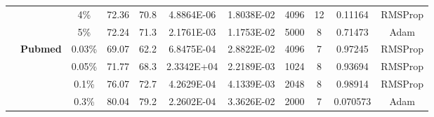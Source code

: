 \documentclass{article}
\begin{document}
\begin{table}[htbp]
\begin{tabular}{ccccc|cccccc}
          &       & 4\%   & 72.36 & 70.8  & 4.8864E-06 & 1.8038E-02 & 4096  & 12    & 0.11164 & RMSProp \\
          &       & 5\%   & 72.24 & 71.3  & 2.1761E-03 & 1.1753E-02 & 5000  & 8     & 0.71473 & Adam \\
          & \multirow{4}[1]{*}{\textbf{Pubmed}} & 0.03\% & 69.07 & 62.2  & 6.8475E-04 & 2.8822E-02 & 4096  & 7     & 0.97245 & RMSProp \\
          &       & 0.05\% & 71.77 & 68.3  & 2.3342E+04 & 2.2189E-03 & 1024  & 8     & 0.93694 & RMSProp \\
          &       & 0.1\% & 76.07 & 72.7  & 4.2629E-04 & 4.1339E-03 & 2048  & 8     & 0.98914 & RMSProp \\
          &       & 0.3\% & 80.04 & 79.2  & 2.2602E-04 & 3.3626E-02 & 2000  & 7     & 0.070573 & Adam \\
    \bottomrule
    \bottomrule
    \end{tabular}\label{tab:hyperparameters_without_validation}\end{table} 
\end{document}
